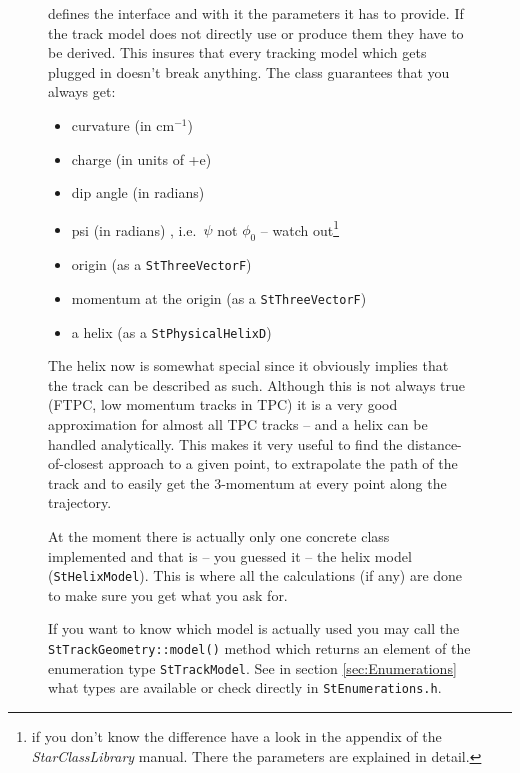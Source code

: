 \documentclass[twoside]{article}
\newcommand{\name}[1]{\textsl{#1}}%
\begin{document}
\begin{figure}[htb]
\begin{center}
\begin{description}
    defines the interface and with it the parameters it has to
    provide. If the track model does not directly use or produce them
    they have to be derived. This insures that every tracking model
    which gets plugged in doesn't break anything. The class guarantees
    that you always get:
    \begin{itemize}
    \item curvature (in cm$^{-1}$)
    \item charge (in units of +e)
    \item dip angle (in radians)
    \item psi (in radians) , i.e.~$\psi$ not $\phi_0$ -- watch
        out\footnote{if you don't know the difference have a look in
            the appendix of the \name{StarClassLibrary} manual.  There
            the parameters are explained in detail.}
    \item origin (as a \texttt{StThreeVectorF})
    \item momentum at the origin (as a \texttt{StThreeVectorF})
    \item a helix (as a \texttt{StPhysicalHelixD})
    \end{itemize}
    The helix now is somewhat special since it obviously implies that
    the track can be described as such. Although this is not always
    true (FTPC, low momentum tracks in TPC) it is a very good
    approximation for almost all TPC tracks -- and a helix can be
    handled analytically. This makes it very useful to find the
    distance-of-closest approach to a given point, to extrapolate the
    path of the track and to easily get the 3-momentum at every point
    along the trajectory.
    
    At the moment there is actually only one concrete class
    implemented and that is -- you guessed it -- the helix model
    (\texttt{StHelixModel}). This is where all the calculations (if
    any) are done to make sure you get what you ask for.
    
    If you want to know which model is actually used you may call the
    \texttt{StTrackGeometry::model()} method which returns an element
    of the enumeration type \texttt{StTrackModel}. See in section
    \ref{sec:Enumerations} what types are available or check directly
    in \texttt{StEnumerations.h}.
    

\end{description}
\end{center}
\end{figure}
\end{document}
